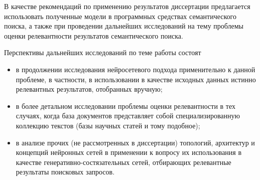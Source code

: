 В качестве рекомендаций по применению результатов диссертации предлагается использовать полученные модели в программных средствах
семантического поиска, а также при проведении дальнейших исследований на тему проблемы оценки релевантности результатов семантического поиска.

Перспективы дальнейших исследований по теме работы состоят
\begin{itemize}
    \item в продолжении исследования нейросетевого подхода применительно к данной проблеме, в частности, в использовании в качестве исходных
          данных истинно релевантных результатов, отобранных вручную;
    \item в более детальном исследовании проблемы оценки релевантности в тех случаях, когда база документов представляет собой специализированную
          коллекцию текстов (базы научных статей и тому подобное);
    \item в анализе прочих (не рассмотренных в диссертации) топологий, архитектур и концепций нейронных сетей в применении к вопросу их 
          использования в качестве генеративно-состязательных сетей, отбирающих релевантные результаты поисковых запросов.
\end{itemize}